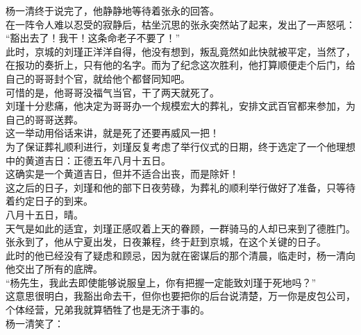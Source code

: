 \begin{multicols}{\theparacolNo}
杨一清终于说完了，他静静地等待着张永的回答。\\

在一阵令人难以忍受的寂静后，枯坐沉思的张永突然站了起来，发出了一声怒吼：\\

“豁出去了！我干！这条命老子不要了！”\\

此时，京城的刘瑾正洋洋自得，他没有想到，叛乱竟然如此快就被平定，当然了，在报功的奏折上，只有他的名字。而为了纪念这次胜利，他打算顺便走个后门，给自己的哥哥封个官，就给他个都督同知吧。\\

可惜的是，他哥哥没福气当官，干了两天就死了。\\

刘瑾十分悲痛，他决定为哥哥办一个规模宏大的葬礼，安排文武百官都来参加，为自己的哥哥送葬。\\

这一举动用俗话来讲，就是死了还要再威风一把！\\

为了保证葬礼顺利进行，刘瑾反复考虑了举行仪式的日期，终于选定了一个他理想中的黄道吉日：正德五年八月十五日。\\

这确实是一个黄道吉日，但并不适合出丧，而是除奸！\\

这之后的日子，刘瑾和他的部下日夜劳碌，为葬礼的顺利举行做好了准备，只等待着约定日子的到来。\\

八月十五日，晴。\\

天气是如此的适宜，刘瑾正感叹着上天的眷顾，一群骑马的人却已来到了德胜门。\\

张永到了，他从宁夏出发，日夜兼程，终于赶到京城，在这个关键的日子。\\

此时的他已经没有了疑虑和顾忌，因为就在密谋后的那个清晨，临走时，杨一清向他交出了所有的底牌。\\

“杨先生，我此去即使能够说服皇上，你有把握一定能致刘瑾于死地吗？”\\

这意思很明白，我豁出命去干，但你也要把你的后台说清楚，万一你是皮包公司，个体经营，兄弟我就算牺牲了也是无济于事的。\\

杨一清笑了：\\


\end{multicols}
